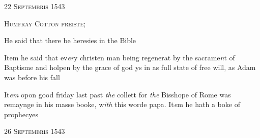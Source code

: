 \documentclass[12pt, a4paper]{book}
\begin{document}
 

            
            
               
				\begin{center} \begin{large} {\scshape 
                  22 Septembris 1543
               } \end{large} \end{center}
			
               
               	
				\begin{center}  {\scshape Humfray Cotton preiste;}  \end{center}
			
               	
               		
		\ifthenelse{\isodd{\thepage}}
		{\reversemarginpar}
		{\normalmarginpar}
		He said that there be heresies in the Bible
               	

	
				\marginpar[\vspace{0.5cm}{\textcolor{Gray}{ herecie}}]{}
			
	
			
               	
		\ifthenelse{\isodd{\thepage}}
		{\reversemarginpar}
		{\normalmarginpar}
		Item he said that ev\textit{er}y christen man being regenerat
 by the sacrame\textit{n}t of Baptisme and holpen by the
 grace of god ys in as full state of free will, as
 Adam was before his fall

 
 	
			
 	
		\ifthenelse{\isodd{\thepage}}
		{\reversemarginpar}
		{\normalmarginpar}
		It\textit{em} opon good friday last past \textit{the} collett for \textit{the} Bisshope of Rome was
 remaynge in his masse booke, w\textit{ith} this worde papa.
 	It\textit{e}m he hath a boke of prophecyes
 
 

            
            
               
				\begin{center} \begin{large} {\scshape 
                  26 Septembris 1543
               } \end{large} \end{center}
			
\end{document}
